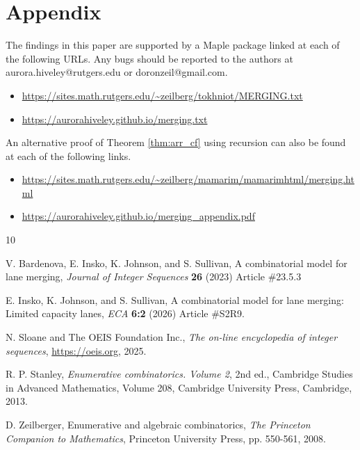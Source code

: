 \documentclass[article]{amsart}
\theoremstyle{plain}
\theoremstyle{definition}
\begin{document}
\section*{Appendix} \label{sec:appen}
The findings in this paper are supported by a Maple package linked at each of the following URLs. Any bugs should be reported to the authors at aurora.hiveley@rutgers.edu or doronzeil@gmail.com. 
\begin{itemize}
    \item \url{https://sites.math.rutgers.edu/~zeilberg/tokhniot/MERGING.txt} 
    \item \url{https://aurorahiveley.github.io/merging.txt}
\end{itemize}

An alternative proof of Theorem \ref{thm:arr_cf} using recursion can also be found at each of the following links.
\begin{itemize}
    \item \url{https://sites.math.rutgers.edu/~zeilberg/mamarim/mamarimhtml/merging.html} 
    \item \url{https://aurorahiveley.github.io/merging_appendix.pdf}
\end{itemize}



\begin{thebibliography}{10}

V. Bardenova, E. Insko, K. Johnson, and S. Sullivan, A combinatorial model for lane merging, \textit{Journal of Integer Sequences}
\textbf{26} (2023) Article \#23.5.3

 E. Insko, K. Johnson, and S. Sullivan, A combinatorial model for lane merging: Limited capacity lanes, \textit{ECA} \textbf{6:2} (2026) Article \#S2R9.

  N. Sloane and The OEIS Foundation Inc., \textit{The on-line encyclopedia of integer sequences}, \url{https://oeis.org}, 2025.

  R. P. Stanley, \textit{Enumerative combinatorics. Volume 2}, 2nd ed., Cambridge Studies in Advanced Mathematics, Volume 208, Cambridge University Press, Cambridge, 2013.

  D. Zeilberger, Enumerative and algebraic combinatorics, \textit{The Princeton Companion to Mathematics}, Princeton University Press, pp. 550-561, 2008. 

\end{thebibliography}
\end{document}
